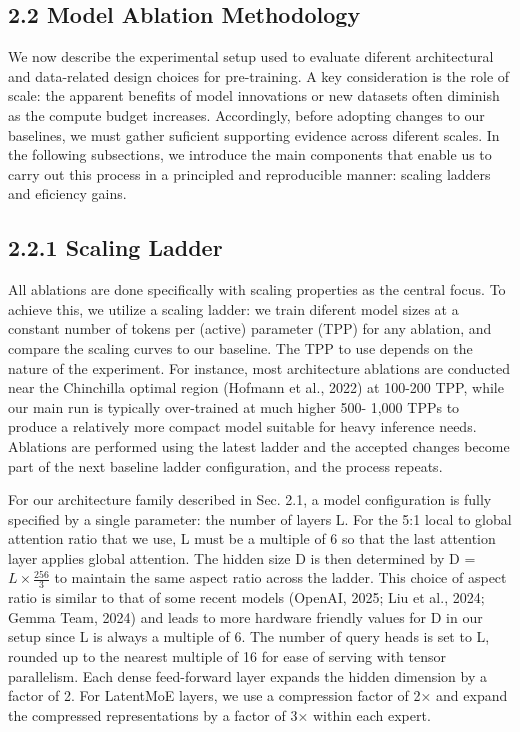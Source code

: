 \documentclass[
  10
]{article}
\begin{document}
\subsection{2.2 Model Ablation
Methodology}\label{model-ablation-methodology}

We now describe the experimental setup used to evaluate diferent
architectural and data-related design choices for pre-training. A key
consideration is the role of scale: the apparent benefits of model
innovations or new datasets often diminish as the compute budget
increases. Accordingly, before adopting changes to our baselines, we
must gather suficient supporting evidence across diferent scales. In the
following subsections, we introduce the main components that enable us
to carry out this process in a principled and reproducible manner:
scaling ladders and eficiency gains.

\subsection{2.2.1 Scaling Ladder}\label{scaling-ladder}

All ablations are done specifically with scaling properties as the
central focus. To achieve this, we utilize a scaling ladder: we train
diferent model sizes at a constant number of tokens per (active)
parameter (TPP) for any ablation, and compare the scaling curves to our
baseline. The TPP to use depends on the nature of the experiment. For
instance, most architecture ablations are conducted near the Chinchilla
optimal region (Hofmann et al., 2022) at 100-200 TPP, while our main run
is typically over-trained at much higher 500- 1,000 TPPs to produce a
relatively more compact model suitable for heavy inference needs.
Ablations are performed using the latest ladder and the accepted changes
become part of the next baseline ladder configuration, and the process
repeats.

For our architecture family described in Sec. 2.1, a model configuration
is fully specified by a single parameter: the number of layers L. For
the 5:1 local to global attention ratio that we use, L must be a
multiple of 6 so that the last attention layer applies global attention.
The hidden size D is then determined by D =
\(L \times \frac { 2 5 6 } { 3 }\) to maintain the same aspect ratio
across the ladder. This choice of aspect ratio is similar to that of
some recent models (OpenAI, 2025; Liu et al., 2024; Gemma Team, 2024)
and leads to more hardware friendly values for D in our setup since L is
always a multiple of 6. The number of query heads is set to L, rounded
up to the nearest multiple of 16 for ease of serving with tensor
parallelism. Each dense feed-forward layer expands the hidden dimension
by a factor of 2. For LatentMoE layers, we use a compression factor of
2× and expand the compressed representations by a factor of 3× within
each expert.
\end{document}
